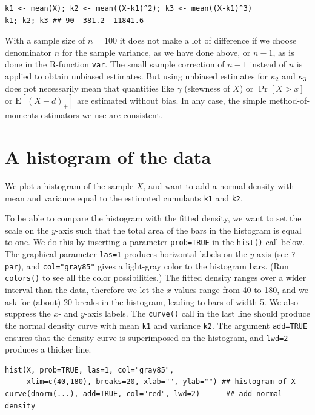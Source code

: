 \documentclass{article}
\begin{document}
\begin{lstlisting}
k1 <- mean(X); k2 <- mean((X-k1)^2); k3 <- mean((X-k1)^3)
k1; k2; k3 ## 90  381.2  11841.6
\end{lstlisting}

With a sample size of $n = 100$ it does not make a lot of difference if we choose denominator $n$ for the sample variance, as we have done above, or $n-1$, as is done in the R-function \texttt{var}. The small sample correction of $n-1$ instead of $n$ is applied to obtain unbiased estimates. But using unbiased estimates for $\kappa_2$ and $\kappa_3$ does not necessarily mean that quantities like $\gamma$ (skewness of $X$) or $\Pr[X > x]$ or $\mathrm{E}[(X-d)_+]$ are estimated without bias. In any case, the simple method-of-moments estimators we use are consistent.

\newpage
\section{A histogram of the data}

We plot a histogram of the sample $X$, and want to add a normal density with mean and variance equal to the estimated cumulants \texttt{k1} and \texttt{k2}.

To be able to compare the histogram with the fitted density, we want to set the scale on the $y$-axis such that the total area of the bars in the histogram is equal to one. We do this by inserting a parameter \texttt{prob=TRUE} in the \texttt{hist()} call below. The graphical parameter \texttt{las=1} produces horizontal labels on the $y$-axis (see \texttt{?par}), and \texttt{col="gray85"} gives a light-gray color to the histogram bars. (Run \texttt{colors()} to see all the color possibilities.) The fitted density ranges over a wider interval than the data, therefore we let the $x$-values range from 40 to 180, and we ask for (about) 20 breaks in the histogram, leading to bars of width 5. We also suppress the $x$- and $y$-axis labels. The \texttt{curve()} call in the last line should produce the normal density curve with mean \texttt{k1} and variance \texttt{k2}. The argument \texttt{add=TRUE} ensures that the density curve is superimposed on the histogram, and \texttt{lwd=2} produces a thicker line.

\begin{lstlisting}
hist(X, prob=TRUE, las=1, col="gray85",
     xlim=c(40,180), breaks=20, xlab="", ylab="") ## histogram of X
curve(dnorm(...), add=TRUE, col="red", lwd=2)      ## add normal density
\end{lstlisting}
\end{document}
